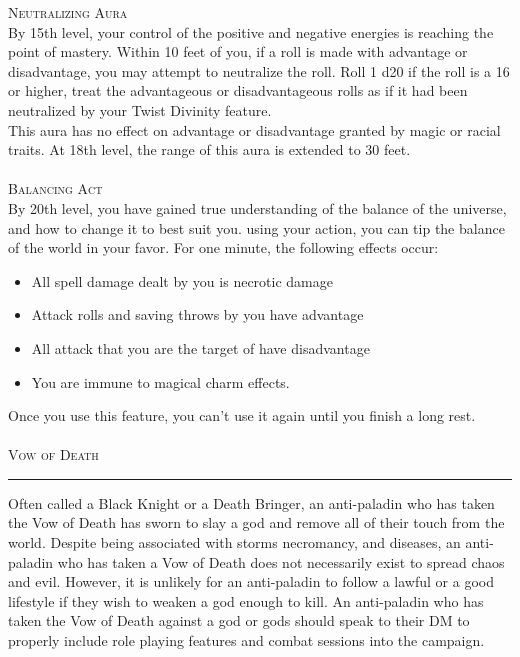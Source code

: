 \documentclass[22pt,a4paper]{article}
\newcommand{\HRule}[2]{\par
  \vspace*{\dimexpr-\parskip-\baselineskip+#2}
  \begingroup
  	\color{sepcol}
  	\noindent\rule{\linewidth}{#1}\par
  \endgroup  
  \vspace*{\dimexpr-\parskip-.5\baselineskip+#2}}
\begin{document}
\begin{multicols*}{2}
{\fontsize{12pt}{12pt}\textcolor{title}{\textsc{Neutralizing Aura}}}\\
By 15th level, your control of the positive and negative energies is reaching the point of mastery. Within 10 feet of you, if a roll is made with advantage or disadvantage, you may attempt to neutralize the roll. Roll 1 d20 if the roll is a 16 or higher, treat the advantageous or disadvantageous rolls as if it had been neutralized by your Twist Divinity feature.\\
\indent This aura has no effect on advantage or disadvantage granted by magic or racial traits.
\indent At 18th level, the range of this aura is extended to 30 feet.\\
\\
{\fontsize{12pt}{12pt}\textcolor{title}{\textsc{Balancing Act}}}\\
By 20th level, you have gained true understanding of the balance of the universe, and how to change it to best suit you. using your action, you can tip the balance of the world in your favor. For one minute, the following effects occur:\\
\begin{itemize}
\setlength\itemsep{-6pt}
\item All spell damage dealt by you is necrotic damage
\item Attack rolls and saving throws by you have advantage
\item All attack that you are the target of have disadvantage
\item You are immune to magical charm effects.
\end{itemize}
Once you use this feature, you can't use it again until you finish a long rest.
\\
\\
{\fontsize{14pt}{14pt}\textcolor{title}{\textsc{Vow of Death}}}
\HRule{1pt}{8pt}
Often called a Black Knight or a Death Bringer, an anti-paladin who has taken the Vow of Death has sworn to slay a god and remove all of their touch from the world. Despite being associated with storms necromancy, and diseases, an anti-paladin who has taken a Vow of Death does not necessarily exist to spread chaos and evil. However, it is unlikely for an anti-paladin to follow a lawful or a good lifestyle if they wish to weaken a god enough to kill. An anti-paladin who has taken the Vow of Death against a god or gods should speak to their DM to properly include role playing features and combat sessions into the campaign.\\
\\

\end{multicols*}
\end{document}
